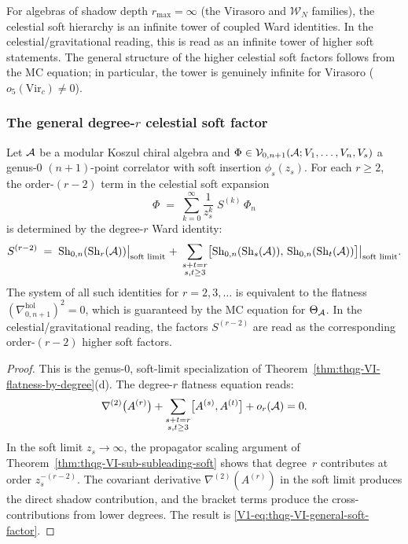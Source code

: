 For algebras of shadow depth $r_{\max} = \infty$ (the Virasoro and
$\mathcal{W}_N$ families), the celestial soft hierarchy is an
infinite tower of coupled Ward identities. In the
celestial/gravitational reading, this is read as an infinite tower of
higher soft statements. The
general structure of the higher celestial soft factors follows
from the MC equation; in particular, the tower is genuinely infinite for Virasoro
($o_5(\mathrm{Vir}_c) \neq 0$).

\subsubsection{The general degree-$r$ celestial soft factor}

\begin{theorem}
Let $\mathcal{A}$ be a modular Koszul chiral algebra and
$\Phi \in \mathcal{V}_{0,n+1}(\mathcal{A}; V_1, \dotsc, V_n, V_s)$ a genus-$0$
$(n+1)$-point correlator with soft insertion $\phi_s(z_s)$.
For each $r \geq 2$, the order-$(r-2)$ term in the celestial soft
expansion
\begin{equation}%
\Phi
\;=\;
\sum_{k=0}^{\infty}
\frac{1}{z_s^k}\;S^{(k)}\,\Phi_n
\end{equation}
is determined by the degree-$r$ Ward identity:
\begin{equation}%
S^{(r-2)}
\;=\;
\Sh_{0,n}(\Sh_r(\cA))\bigl|_{\text{soft limit}}
\;+\;
\sum_{\substack{s+t=r \\ s,t \geq 3}}
\bigl[\Sh_{0,n}(\Sh_s(\cA)),\,
\Sh_{0,n}(\Sh_t(\cA))\bigr]\bigl|_{\text{soft limit}}.
\end{equation}
The system of all such identities for $r = 2, 3, \dotsc$ is
equivalent to the flatness
$(\nabla^{\mathrm{hol}}_{0,n+1})^2 = 0$,
which is guaranteed by the MC equation for $\Theta_{\mathcal{A}}$. In the
celestial/gravitational reading, the factors $S^{(r-2)}$ are read as the
corresponding order-$(r-2)$ higher soft factors.
\end{theorem}

\begin{proof}
This is the genus-$0$, soft-limit specialization of
Theorem~\ref{thm:thqg-VI-flatness-by-degree}(d). The degree-$r$
flatness equation reads:
\[
\nabla^{(2)}\bigl(A^{(r)}\bigr)
+ \sum_{\substack{s+t=r \\ s,t \geq 3}}
\bigl[A^{(s)}, A^{(t)}\bigr]
+ o_r(\mathcal{A})
= 0.
\]
In the soft limit $z_s \to \infty$, the propagator scaling argument
of Theorem~\ref{thm:thqg-VI-sub-subleading-soft} shows that
degree~$r$ contributes at order $z_s^{-(r-2)}$. The covariant
derivative $\nabla^{(2)}(A^{(r)})$ in the soft limit produces the
direct shadow contribution, and the bracket terms produce the
cross-contributions from lower degrees. The result is
\eqref{V1-eq:thqg-VI-general-soft-factor}.
\end{proof}

